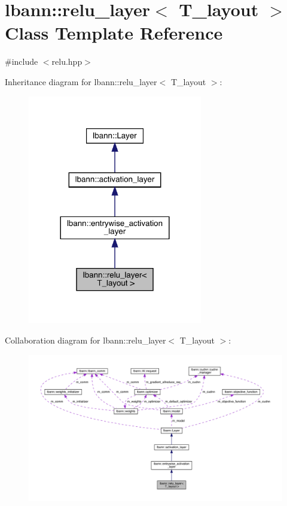 \hypertarget{classlbann_1_1relu__layer}{}\section{lbann\+:\+:relu\+\_\+layer$<$ T\+\_\+layout $>$ Class Template Reference}
\label{classlbann_1_1relu__layer}


{\ttfamily \#include $<$relu.\+hpp$>$}



Inheritance diagram for lbann\+:\+:relu\+\_\+layer$<$ T\+\_\+layout $>$\+:\nopagebreak
\begin{figure}[H]
\begin{center}
\leavevmode
\includegraphics[width=216pt]{classlbann_1_1relu__layer__inherit__graph}
\end{center}
\end{figure}


Collaboration diagram for lbann\+:\+:relu\+\_\+layer$<$ T\+\_\+layout $>$\+:\nopagebreak
\begin{figure}[H]
\begin{center}
\leavevmode
\includegraphics[width=350pt]{classlbann_1_1relu__layer__coll__graph}
\end{center}
\end{figure}
